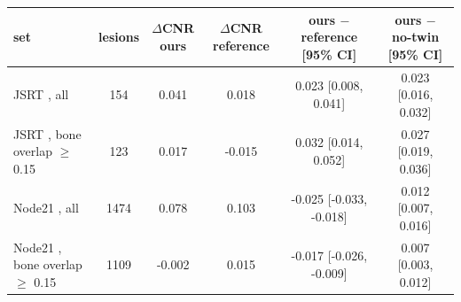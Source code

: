 \begin{tabular}{lccccc}
\toprule
set & lesions & $\Delta$CNR ours & $\Delta$CNR reference & ours $-$ reference [95\% CI] & ours $-$ no-twin [95\% CI] \\
\midrule
JSRT , all & 154 & 0.041 & 0.018 & 0.023 [0.008, 0.041] & 0.023 [0.016, 0.032] \\
JSRT , bone overlap $\geq$ 0.15 & 123 & 0.017 & -0.015 & 0.032 [0.014, 0.052] & 0.027 [0.019, 0.036] \\
Node21 , all & 1474 & 0.078 & 0.103 & -0.025 [-0.033, -0.018] & 0.012 [0.007, 0.016] \\
Node21 , bone overlap $\geq$ 0.15 & 1109 & -0.002 & 0.015 & -0.017 [-0.026, -0.009] & 0.007 [0.003, 0.012] \\
\bottomrule
\end{tabular}
